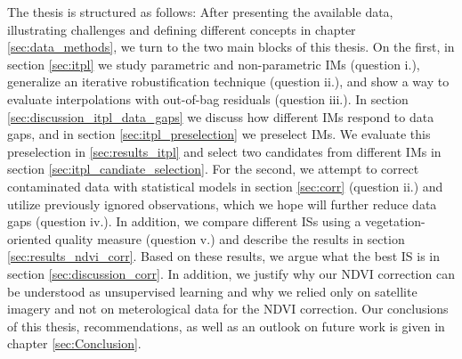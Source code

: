 The thesis is structured as follows: After presenting the available data, illustrating challenges and defining different concepts in chapter \ref{sec:data_methods}, we turn to the two main blocks of this thesis. 
On the first, in section \ref{sec:itpl} we study parametric and non-parametric {{IM}}s (question i.), generalize an iterative robustification technique (question ii.), and show a way to evaluate interpolations with out-of-bag residuals (question iii.). In section \ref{sec:discussion_itpl_data_gaps} we discuss how different {{IM}}s respond to data gaps, and in section \ref{sec:itpl_preselection} we preselect {{IM}}s. We evaluate this preselection in \ref{sec:results_itpl} and select two candidates from different {{IM}}s in section \ref{sec:itpl_candiate_selection}.
For the second, we attempt to correct contaminated data with statistical models in section \ref{sec:corr} (question ii.) and utilize previously ignored observations, which we hope will further reduce data gaps (question iv.). In addition, we compare different {{ISs}} using a vegetation-oriented quality measure (question v.) and describe the results in section \ref{sec:results_ndvi_corr}. Based on these results, we argue what the best {{IS}} is in section \ref{sec:discussion_corr}. In addition, we justify why our NDVI correction can be understood as unsupervised learning and why we relied only on satellite imagery and not on meterological data for the NDVI correction.
Our conclusions of this thesis, recommendations, as well as an outlook on future work is given in chapter \ref{sec:Conclusion}. 








